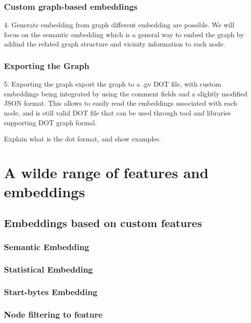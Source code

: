 \subsubsection{Custom graph-based embeddings}
4. Generate embedding from graph
different embedding are possible. We will focus on the semantic embedding which is a general way to embed the graph by addind the related graph structure and vicinity information to each node.

\subsubsection{Exporting the Graph}
5. Exporting the graph
export the graph to a .gv DOT file, with custom embeddings being integrated by using the comment fields and a slightly modified JSON format. This allows to easily read the embeddings associated with each node, and is still valid DOT file that can be used through tool and libraries supporting DOT graph formal.

Explain what is the dot format, and show examples.


\section{A wilde range of features and embeddings}

\subsection{Embeddings based on custom features}

\subsubsection{Semantic Embedding}\label{sec:mem_2_graph:semantic_embedding}

\subsubsection{Statistical Embedding}

\subsubsection{Start-bytes Embedding}

\subsubsection{Node filtering to feature}

